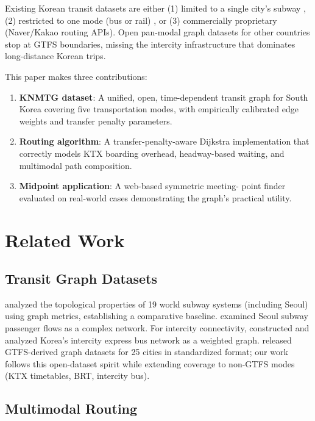 \documentclass[12pt]{article}
\begin{document}
Existing Korean transit datasets are either (1) limited to a single
city's subway \citep{lee2008, kim2019}, (2) restricted to one mode (bus
or rail) \citep{lee2012}, or (3) commercially proprietary (Naver/Kakao
routing APIs). Open pan-modal graph datasets for other countries
\citep{kujala2018} stop at GTFS boundaries, missing the intercity
infrastructure that dominates long-distance Korean trips.

This paper makes three contributions:
\begin{enumerate}
  \item \textbf{KNMTG dataset}: A unified, open, time-dependent transit
    graph for South Korea covering five transportation modes, with
    empirically calibrated edge weights and transfer penalty parameters.
  \item \textbf{Routing algorithm}: A transfer-penalty-aware Dijkstra
    implementation that correctly models KTX boarding overhead,
    headway-based waiting, and multimodal path composition.
  \item \textbf{Midpoint application}: A web-based symmetric meeting-
    point finder evaluated on real-world cases demonstrating the
    graph's practical utility.
\end{enumerate}

\section{Related Work}

\subsection{Transit Graph Datasets}

\citet{derrible2009} analyzed the topological
properties of 19 world subway systems (including Seoul) using graph
metrics, establishing a comparative baseline. \citet{lee2008}
examined Seoul subway passenger flows as a complex network. For
intercity connectivity, \citet{lee2012} constructed and
analyzed Korea's intercity express bus network as a weighted graph.
\citet{kujala2018} released GTFS-derived graph datasets
for 25 cities in standardized format; our work follows this
open-dataset spirit while extending coverage to non-GTFS modes (KTX
timetables, BRT, intercity bus).

\subsection{Multimodal Routing}
\end{document}
